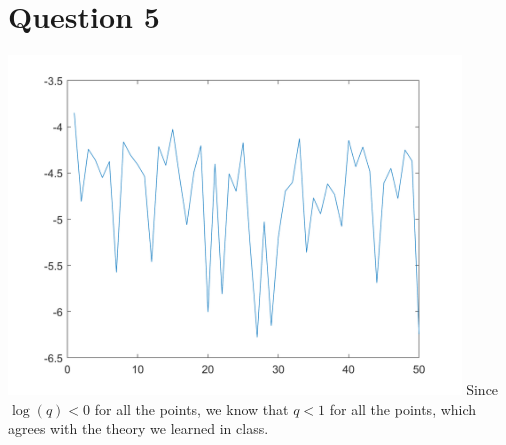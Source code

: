 \documentclass{article}
\begin{document}
\section*{Question 5}

\includegraphics[width = 12cm]{qPlot.png}
Since $\log(q) < 0$ for all the points,
we know that $q < 1$ for all the points,
which agrees with the theory we learned in class.
\end{document}
